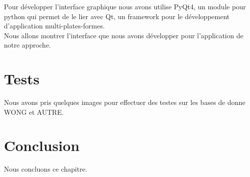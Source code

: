 Pour développer l'interface graphique nous avons utilise PyQt4, un module pour python qui permet de le lier avec Qt, un framework pour le développement d'application multi-plates-formes.\\

Nous allons montrer l'interface que nous avons développer pour l'application de notre approche.


\section{Tests}

Nous avons pris quelques images pour effectuer des testes sur les bases de donne WONG et AUTRE.

\section{Conclusion}

Nous concluons ce chapitre.
